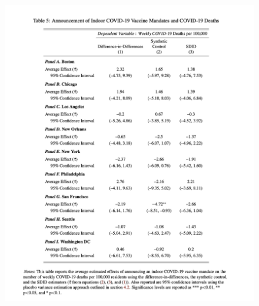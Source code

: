 \documentclass{beamer}
\begin{document}
\begin{frame}[plain]

	\begin{figure}
	\includegraphics[scale=0.3]{./lecture_includes/vitor_table5}
	\end{figure}

\end{frame}
\end{document}
